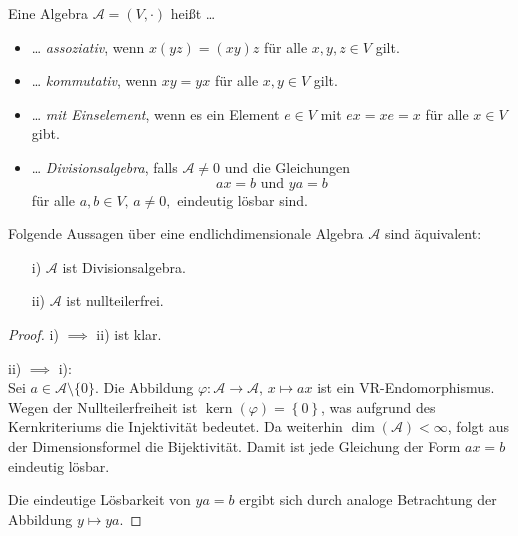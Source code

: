 \documentclass[aspectratio=169]{beamer}
\DeclareMathOperator{\kernel}{kern}
\begin{document}
    \begin{frame}
        \begin{definition}
            Eine Algebra \(\mathcal{A} = (V, \cdot)\) heißt \dots
            \begin{itemize}
                \item
                    \dots{} \textit{assoziativ}, wenn \(x(yz) = (xy)z\) für alle \(x, y, z \in V\) gilt.
                \item
                    \dots{} \textit{kommutativ}, wenn \(xy = yx\) für alle \(x, y \in V\) gilt.
                \item
                    \dots{} \textit{mit Einselement}, wenn es ein Element \(e \in V\) mit \(ex = xe = x\) für alle \(x \in V\) gibt.

                \item
                    \dots{} \textit{Divisionsalgebra}, falls \(\mathcal{A} \neq 0\) und die Gleichungen
                    \[
                        ax = b \text{ und } ya = b
                    \]
                    für alle \(a, b \in V, \, a \neq 0,\) eindeutig lösbar sind.
            \end{itemize}
        \end{definition}
    \end{frame}

    \begin{frame}
        \begin{lemma}
            Folgende Aussagen über eine endlichdimensionale Algebra \(\mathcal{A}\) sind äquivalent:
            \begin{itemize}
                \item[i)]
                    \(\mathcal{A}\) ist Divisionsalgebra.

                \item[ii)]
                    \(\mathcal{A}\) ist nullteilerfrei.
            \end{itemize}
        \end{lemma}
    \end{frame}

    \begin{frame}
        \begin{proof}
            i) \(\implies\) ii) ist klar.

            ii) \(\implies\) i): \\
            Sei \(a \in \mathcal{A} \setminus \{0\}\).
            Die Abbildung \(\varphi \colon \mathcal{A} \to \mathcal{A},\, x \mapsto ax\) ist ein VR-Endomorphismus.
            Wegen der Nullteilerfreiheit ist \(\kernel(\varphi) = \left\{ 0 \right\}\), was aufgrund des Kernkriteriums die Injektivität bedeutet.
            Da weiterhin \(\dim(\mathcal{A}) < \infty\), folgt aus der Dimensionsformel die Bijektivität.
            Damit ist jede Gleichung der Form \(ax = b\) eindeutig lösbar.

            Die eindeutige Lösbarkeit von \(ya = b\) ergibt sich durch analoge Betrachtung der Abbildung \(y \mapsto ya\).
        \end{proof}
    \end{frame}
\end{document}
